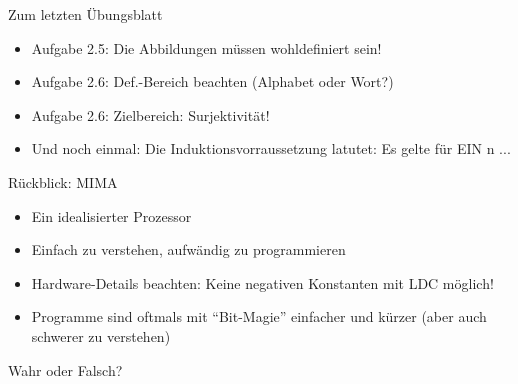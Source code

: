 





\graphicspath{{../figures/}}




\begin{frame}{Zum letzten Übungsblatt}
	\begin{itemize}[<+->]
		\item Aufgabe 2.5: Die Abbildungen müssen wohldefiniert sein!
		\item Aufgabe 2.6: Def.-Bereich beachten (Alphabet oder Wort?)
		\item Aufgabe 2.6: Zielbereich: Surjektivität!
		\item Und noch einmal: Die Induktionsvorraussetzung latutet: Es gelte für EIN n ...
	\end{itemize}
\end{frame}

\framePrevEpisode

\begin{frame}{Rückblick: MIMA}
	\begin{itemize}[<+->]
		\item Ein idealisierter Prozessor
		\item Einfach zu verstehen, aufwändig zu programmieren
		\item Hardware-Details beachten: Keine negativen Konstanten mit LDC möglich!
		\item Programme sind oftmals mit \enquote{Bit-Magie} einfacher und kürzer (aber auch schwerer zu verstehen)
	\end{itemize}
\end{frame}

\begin{frame}{Wahr oder Falsch?}
	\begin{block}{}
	\begin{itemize}
	\end{itemize}
	\end{block}
\end{frame}

